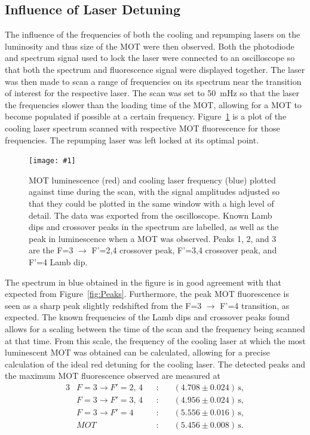 \documentclass[twocolumn]{article}
\newcommand{\insertFigure}[1]{%
   \texttt{[image: \#1]}%
}
\begin{document}
\subsection{Influence of Laser Detuning} \label{sec:det}
The influence of the frequencies of both the cooling and repumping lasers on the luminosity and thus size of the MOT were then observed. Both the photodiode and spectrum signal used to lock the laser were connected to an oscilloscope so that both the spectrum and fluorescence signal were displayed together. The laser was then made to scan a range of frequencies on its spectrum near the transition of interest for the respective laser. The scan was set to 50~mHz so that the laser the frequencies slower than the loading time of the MOT, allowing for a MOT to become populated if possible at a certain frequency. Figure~\ref{fig:Detuning} is a plot of the cooling laser spectrum scanned with respective MOT fluorescence for those frequencies. The repumping laser was left locked at its optimal point.
\begin{figure} [!h]
	\centering
	\insertFigure{Images/Detuning1.png}
	\caption{MOT luminescence (red) and cooling laser frequency (blue) plotted against time during the scan, with the signal amplitudes adjusted so that they could be plotted in the same window with a high level of detail. The data was exported from the oscilloscope. Known Lamb dips and crossover peaks in the spectrum are labelled, as well as the peak in luminescence when a MOT was observed. Peaks 1, 2, and 3 are the F=3 $\to$ F'=2,4 crossover peak, F'=3,4 crossover peak, and F'=4 Lamb dip.}
	\label{fig:Detuning}
\end{figure} 
The spectrum in blue obtained in the figure is in good agreement with that expected from Figure~\ref{fig:Peaks}. Furthermore, the peak MOT fluorescence is seen as a sharp peak slightly redshifted from the F=3 $\to$ F'=4 transition, as expected. The known frequencies of the Lamb dips and crossover peaks found allows for a scaling between the time of the scan and the frequency being scanned at that time. From this scale, the frequency of the cooling laser at which the most luminescent MOT was obtained can be calculated, allowing for a precise calculation of the ideal red detuning for the cooling laser. The detected peaks and the maximum MOT fluorescence observed are measured at
\begin{alignat*}{3}
&F=3 \rightarrow F'=2, \, 4&&: \hspace{12pt} &(4.708 \pm 0.024) \, \text{s},\\
&F=3 \rightarrow F'=3, \, 4&&:  &(4.956 \pm 0.024) \, \text{s},\\
&F=3 \rightarrow F'=4&&:		 &(5.556 \pm 0.016)\, \text{s},\\
&MOT			&&:		&(5.456 \pm 0.008) \, \text{s}.
\end{alignat*}
\end{document}
